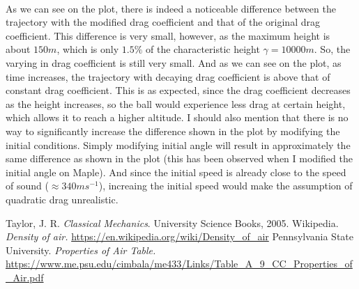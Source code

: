 \documentclass{article}
\begin{document}
\begin{enumerate}
\begin{enumerate}
\begin{figure}[ht]
        \label{fig:label}
    \end{figure}\\
    As we can see on the plot, there is indeed a noticeable difference between the trajectory with the modified drag coefficient
    and that of the original drag coefficient. This difference is very small, however, as the maximum height is about \(150m\), which is only \(1.5\%\)
    of the characteristic height \(\gamma=10000m\). So, the varying in drag coefficient is still very small.
    And as we can see on the plot, as time increases, the trajectory with decaying drag coefficient is above that of constant
    drag coefficient. This is as expected, since the drag coefficient decreases as the height increases, so the ball
    would experience less drag at certain height, which allows it to reach a higher altitude.
    I should also mention that there is no way to significantly increase the difference shown in the plot by modifying the initial conditions. Simply modifying initial angle will result in approximately the same difference as shown in the plot (this has been observed when I modified the initial angle on Maple).
    And since the initial speed is already close to the speed of sound (\(\approx 340ms^{-1}\)), increaing the initial speed would make the assumption of quadratic drag unrealistic.


  \end{enumerate}
\end{enumerate}

\begin{thebibliography}{1}

 Taylor, J. R. \textit{Classical Mechanics}. University Science Books, 2005.
 Wikipedia. \textit{Density of air.} \url{https://en.wikipedia.org/wiki/Density_of_air}
 Pennsylvania State University. \textit{Properties of Air Table.} \url{https://www.me.psu.edu/cimbala/me433/Links/Table_A_9_CC_Properties_of_Air.pdf}
\end{thebibliography}
\end{document}
